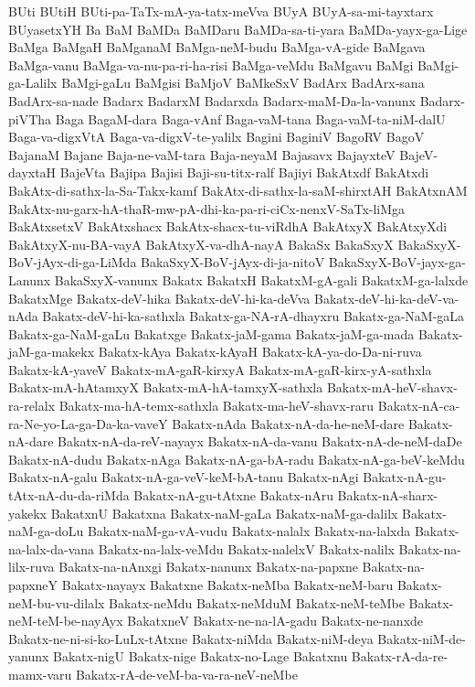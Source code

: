 {BUti
BUtiH
BUti-pa-TaTx-mA-ya-tatx-meVva
BUyA
BUyA-sa-mi-tayxtarx
BUyasetxYH
Ba
BaM
BaMDa
BaMDaru
BaMDa-sa-ti-yara
BaMDa-yayx-ga-Lige
BaMga
BaMgaH
BaMganaM
BaMga-neM-budu
BaMga-vA-gide
BaMgava
BaMga-vanu
BaMga-va-nu-pa-ri-ha-risi
BaMga-veMdu
BaMgavu
BaMgi
BaMgi-ga-Lalilx
BaMgi-gaLu
BaMgisi
BaMjoV
BaMkeSxV
BadArx
BadArx-sana
BadArx-sa-nade
Badarx
BadarxM
Badarxda
Badarx-maM-Da-la-vanunx
Badarx-piVTha
Baga
BagaM-dara
Baga-vAnf
Baga-vaM-tana
Baga-vaM-ta-niM-dalU
Baga-va-digxVtA
Baga-va-digxV-te-yalilx
Bagini
BaginiV
BagoRV
BagoV
BajanaM
Bajane
Baja-ne-vaM-tara
Baja-neyaM
Bajasavx
BajayxteV
BajeV-dayxtaH
BajeVta
Bajipa
Bajisi
Baji-su-titx-ralf
Bajiyi
BakAtxdf
BakAtxdi
BakAtx-di-sathx-la-Sa-Takx-kamf
BakAtx-di-sathx-la-saM-shirxtAH
BakAtxnAM
BakAtx-nu-garx-hA-thaR-mw-pA-dhi-ka-pa-ri-ciCx-nenxV-SaTx-liMga
BakAtxsetxV
BakAtxshacx
BakAtx-shacx-tu-viRdhA
BakAtxyX
BakAtxyXdi
BakAtxyX-nu-BA-vayA
BakAtxyX-va-dhA-nayA
BakaSx
BakaSxyX
BakaSxyX-BoV-jAyx-di-ga-LiMda
BakaSxyX-BoV-jAyx-di-ja-nitoV
BakaSxyX-BoV-jayx-ga-Lanunx
BakaSxyX-vanunx
Bakatx
BakatxH
BakatxM-gA-gali
BakatxM-ga-lalxde
BakatxMge
Bakatx-deV-hika
Bakatx-deV-hi-ka-deVva
Bakatx-deV-hi-ka-deV-va-nAda
Bakatx-deV-hi-ka-sathxla
Bakatx-ga-NA-rA-dhayxru
Bakatx-ga-NaM-gaLa
Bakatx-ga-NaM-gaLu
Bakatxge
Bakatx-jaM-gama
Bakatx-jaM-ga-mada
Bakatx-jaM-ga-makekx
Bakatx-kAya
Bakatx-kAyaH
Bakatx-kA-ya-do-Da-ni-ruva
Bakatx-kA-yaveV
Bakatx-mA-gaR-kirxyA
Bakatx-mA-gaR-kirx-yA-sathxla
Bakatx-mA-hAtamxyX
Bakatx-mA-hA-tamxyX-sathxla
Bakatx-mA-heV-shavx-ra-relalx
Bakatx-ma-hA-temx-sathxla
Bakatx-ma-heV-shavx-raru
Bakatx-nA-ca-ra-Ne-yo-La-ga-Da-ka-vaveY
Bakatx-nAda
Bakatx-nA-da-he-neM-dare
Bakatx-nA-dare
Bakatx-nA-da-reV-nayayx
Bakatx-nA-da-vanu
Bakatx-nA-de-neM-daDe
Bakatx-nA-dudu
Bakatx-nAga
Bakatx-nA-ga-bA-radu
Bakatx-nA-ga-beV-keMdu
Bakatx-nA-galu
Bakatx-nA-ga-veV-keM-bA-tanu
Bakatx-nAgi
Bakatx-nA-gu-tAtx-nA-du-da-riMda
Bakatx-nA-gu-tAtxne
Bakatx-nAru
Bakatx-nA-sharx-yakekx
BakatxnU
Bakatxna
Bakatx-naM-gaLa
Bakatx-naM-ga-dalilx
Bakatx-naM-ga-doLu
Bakatx-naM-ga-vA-vudu
Bakatx-nalalx
Bakatx-na-lalxda
Bakatx-na-lalx-da-vana
Bakatx-na-lalx-veMdu
Bakatx-nalelxV
Bakatx-nalilx
Bakatx-na-lilx-ruva
Bakatx-na-nAnxgi
Bakatx-nanunx
Bakatx-na-papxne
Bakatx-na-papxneY
Bakatx-nayayx
Bakatxne
Bakatx-neMba
Bakatx-neM-baru
Bakatx-neM-bu-vu-dilalx
Bakatx-neMdu
Bakatx-neMduM
Bakatx-neM-teMbe
Bakatx-neM-teM-be-nayAyx
BakatxneV
Bakatx-ne-na-lA-gadu
Bakatx-ne-nanxde
Bakatx-ne-ni-si-ko-LuLx-tAtxne
Bakatx-niMda
Bakatx-niM-deya
Bakatx-niM-de-yanunx
Bakatx-nigU
Bakatx-nige
Bakatx-no-Lage
Bakatxnu
Bakatx-rA-da-re-mamx-varu
Bakatx-rA-de-veM-ba-va-ra-neV-neMbe
}
